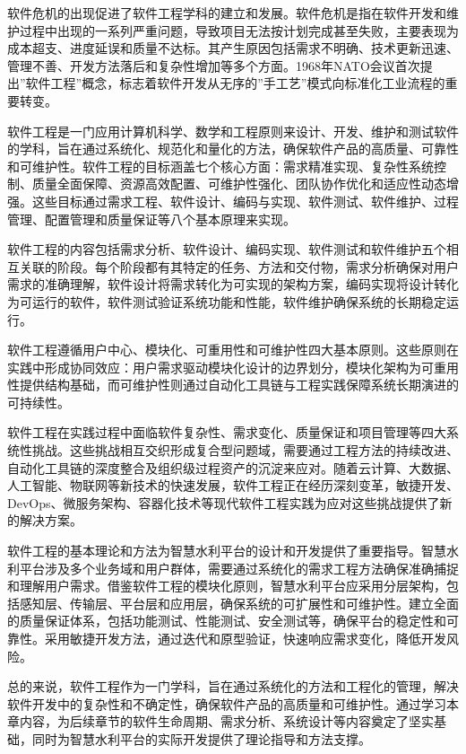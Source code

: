 软件危机的出现促进了软件工程学科的建立和发展。软件危机是指在软件开发和维护过程中出现的一系列严重问题，导致项目无法按计划完成甚至失败，主要表现为成本超支、进度延误和质量不达标。其产生原因包括需求不明确、技术更新迅速、管理不善、开发方法落后和复杂性增加等多个方面。1968年NATO会议首次提出''软件工程''概念，标志着软件开发从无序的''手工艺''模式向标准化工业流程的重要转变。

软件工程是一门应用计算机科学、数学和工程原则来设计、开发、维护和测试软件的学科，旨在通过系统化、规范化和量化的方法，确保软件产品的高质量、可靠性和可维护性。软件工程的目标涵盖七个核心方面：需求精准实现、复杂性系统控制、质量全面保障、资源高效配置、可维护性强化、团队协作优化和适应性动态增强。这些目标通过需求工程、软件设计、编码与实现、软件测试、软件维护、过程管理、配置管理和质量保证等八个基本原理来实现。

软件工程的内容包括需求分析、软件设计、编码实现、软件测试和软件维护五个相互关联的阶段。每个阶段都有其特定的任务、方法和交付物，需求分析确保对用户需求的准确理解，软件设计将需求转化为可实现的架构方案，编码实现将设计转化为可运行的软件，软件测试验证系统功能和性能，软件维护确保系统的长期稳定运行。

软件工程遵循用户中心、模块化、可重用性和可维护性四大基本原则。这些原则在实践中形成协同效应：用户需求驱动模块化设计的边界划分，模块化架构为可重用性提供结构基础，而可维护性则通过自动化工具链与工程实践保障系统长期演进的可持续性。

软件工程在实践过程中面临软件复杂性、需求变化、质量保证和项目管理等四大系统性挑战。这些挑战相互交织形成复合型问题域，需要通过工程方法的持续改进、自动化工具链的深度整合及组织级过程资产的沉淀来应对。随着云计算、大数据、人工智能、物联网等新技术的快速发展，软件工程正在经历深刻变革，敏捷开发、DevOps、微服务架构、容器化技术等现代软件工程实践为应对这些挑战提供了新的解决方案。

软件工程的基本理论和方法为智慧水利平台的设计和开发提供了重要指导。智慧水利平台涉及多个业务域和用户群体，需要通过系统化的需求工程方法确保准确捕捉和理解用户需求。借鉴软件工程的模块化原则，智慧水利平台应采用分层架构，包括感知层、传输层、平台层和应用层，确保系统的可扩展性和可维护性。建立全面的质量保证体系，包括功能测试、性能测试、安全测试等，确保平台的稳定性和可靠性。采用敏捷开发方法，通过迭代和原型验证，快速响应需求变化，降低开发风险。

总的来说，软件工程作为一门学科，旨在通过系统化的方法和工程化的管理，解决软件开发中的复杂性和不确定性，确保软件产品的高质量和可维护性。通过学习本章内容，为后续章节的软件生命周期、需求分析、系统设计等内容奠定了坚实基础，同时为智慧水利平台的实际开发提供了理论指导和方法支撑。

